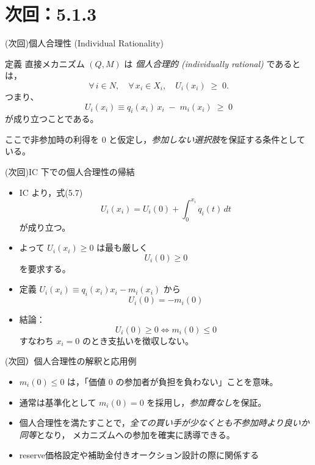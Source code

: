 \documentclass[dvipdfmx,autodetect-engine]{beamer}
\begin{document}
\section{次回：5.1.3}

\begin{frame}{(次回)個人合理性 (Individual Rationality)}
  \begin{block}{定義}
    直接メカニズム $(Q,M)$ は \emph{個人合理的 (individually rational)} であるとは，
    \[
  \forall\,i\in N,\quad \forall\,x_i\in X_i,\quad U_i(x_i)\;\ge\;0.
    \]
    つまり、
    \[
      U_i(x_i)\equiv q_i(x_i)\,x_i \; - \; m_i(x_i)\;\ge\;0
    \]
    が成り立つことである。
  \end{block}
  \vspace{1ex}
  ここで非参加時の利得を $0$ と仮定し，\emph{参加しない選択肢}を保証する条件としている。
\end{frame}

\begin{frame}{(次回)IC 下での個人合理性の帰結}
  \begin{itemize}
    \item IC より，式(5.7)
      \[U_i(x_i)=U_i(0)+\int_{0}^{x_i}q_i(t)\,dt\]
      が成り立つ。
    \item よって $U_i(x_i)\ge0$ は最も厳しく
      \[U_i(0)\ge0\]
      を要求する。
    \item 定義 $U_i(x_i)\equiv q_i(x_i)x_i - m_i(x_i)$ から
      \[U_i(0)=-m_i(0)\]
    \item 結論：
      \[U_i(0)\ge0\iff m_i(0)\le0\]
      すなわち $x_i=0$ のとき支払いを徴収しない。
  \end{itemize}
\end{frame}

\begin{frame}{(次回）個人合理性の解釈と応用例}
  \begin{itemize}
    \item $m_i(0)\le0$ は，「価値 0 の参加者が負担を負わない」ことを意味。
    \item 通常は基準化として $m_i(0)=0$ を採用し，\emph{参加費なし}を保証。
    \item 個人合理性を満たすことで，\emph{全ての買い手が少なくとも不参加時より良いか同等}となり，
      メカニズムへの参加を確実に誘導できる。
    \item reserve価格設定や補助金付きオークション設計の際に関係する
  \end{itemize}
\end{frame}
\end{document}
